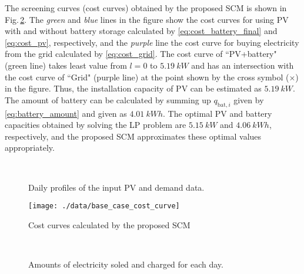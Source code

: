 \documentclass[lettersize,journal]{IEEEtran}
\newcommand{\figref}[1]{Fig.\,\ref{#1}}
\begin{document}
%
The screening curves (cost curves) obtained by the proposed SCM is shown in \figref{fig:cost_curves}. 
The \emph{green} and \emph{blue} lines in the figure show the cost curves for using PV with and without battery storage calculated by \eqref{eq:cost_battery_final} and \eqref{eq:cost_pv}, respectively, and the \emph{purple} line the cost curve for buying electricity from the grid calculated by \eqref{eq:cost_grid}. 
The cost curve of ``PV+battery" (green line) takes least value from $l= 0$ to $\SI{5.19}{kW}$ and has an intersection with the cost curve of ``Grid" (purple line) at the point shown by the cross symbol ($\times$) in the figure.  
Thus, the installation capacity of PV can be estimated as $\SI{5.19}{kW}$. 
The amount of battery can be calculated by summing up $q_{\mathrm{bat}, i}$ given by \eqref{eq:battery_amount} and given as $\SI{4.01}{kWh}$. 
The optimal PV and battery capacities obtained by solving the LP problem are $\SI{5.15}{kW}$ and $\SI{4.06}{kWh}$, respectively, and the proposed SCM approximates these optimal values appropriately. 

\begin{figure}[!t]
 \centering
 \\[2mm]
 \caption{Daily profiles of the input PV and demand data.} \label{fig:input_data}
\end{figure}

\begin{figure}[!t]
 \centering
 \texttt{[image: ./data/base\_case\_cost\_curve]}
 \caption{Cost curves calculated by the proposed SCM} \label{fig:cost_curves}
\end{figure}

\begin{figure}[!t]
 \centering
 \\[2mm]
 \caption{Amounts of electricity soled and charged for each day.} \label{fig:profile}
\end{figure}

\end{document}
